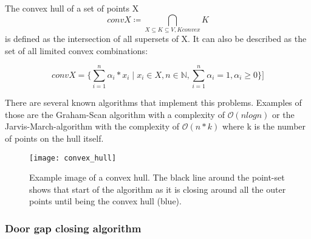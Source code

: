 The convex hull of a set of points X \begin{equation}conv X \coloneqq \underset{X \subseteq K \subseteq V, K convex}{\bigcap} K  \end{equation} is defined as the intersection of all supersets of X. It can also be described as the set of all limited convex combinations:

\begin{equation}conv X = \{ \sum_{i=1}^{n}\alpha_{i} * x_{i} \mid x_{i} \in X, n \in \mathbb{N}, \sum_{i=1}^{n} \alpha_i = 1, \alpha_i \geq 0  \}]\end{equation}

There are several known algorithms that implement this problems. Examples of those are the Graham-Scan algorithm with a complexity of  $\mathcal{O}(n log n)$ or the Jarvis-March-algorithm with the complexity of $\mathcal{O}(n*k)$ where k is the number of points on the hull itself.

\begin{figure}[h]
	\centering
	\texttt{[image: convex\_hull]}
	\caption{Example image of a convex hull. The black line around the point-set shows that start of the algorithm as it is closing around all the outer points until  being the convex hull (blue).}
	\label{fig:convex_hull}
\end{figure}


\pagebreak

\subsubsection{Door gap closing algorithm}
\label{sec:DoorGapAlgorithm}


